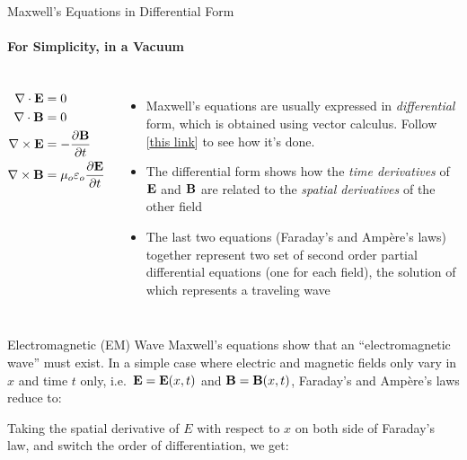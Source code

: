 \documentclass[12pt,aspectratio=169]{beamer}
\newcommand{\eq}[2]{\vspace{#1}{\Large\begin{displaymath}#2\end{displaymath}}}
\begin{document}
\begin{frame}{Maxwell's Equations in Differential Form}
  \framesubtitle{For Simplicity, in a Vacuum}
  \begin{columns}

    {\Large
      \begin{align*}
        \nabla\cdot\mathbf{E} &= 0\\
        \nabla\cdot\mathbf{B} &= 0\\
        \nabla\times\mathbf{E} &=-\frac{\partial\mathbf{B}}{\partial t}\\
        \nabla\times\mathbf{B} &=\mu_o\varepsilon_o\frac{\partial\mathbf{E}}{\partial t}
      \end{align*}
    }

    \begin{itemize}
    \item Maxwell's equations are usually expressed in \emph{differential} form,
      which is obtained using vector calculus. Follow
      [\underline{\href{https://www.wikihow.com/Convert-Maxwell\%27s-Equations-into-Differential-Form}{this link}}]
      to see how it's done.
    \item The differential form shows how the \emph{time derivatives} of
      $\mathbf{E}$ and $\mathbf{B}$ are related to the \emph{spatial derivatives}
      of the other field
    \item The last two equations (Faraday's and Amp\`{e}re's laws) together
      represent two set of second order partial differential equations (one for
      each field), the solution of which represents a traveling wave
    \end{itemize}
  \end{columns}
\end{frame}



\begin{frame}{Electromagnetic (EM) Wave}
  Maxwell's equations show that an ``electromagnetic wave'' must exist. In a
  simple case where electric and magnetic fields only vary in
  $x$ and time $t$ only, i.e.\ $\mathbf{E}=\mathbf{E}(x,t)$ and $\mathbf{B}=\mathbf{B}(x,t)$,
  Faraday's and Amp\`{e}re's laws reduce to:

  \eq{-.1in}{
    \frac{\partial E}{\partial x}=-\frac{\partial B}{\partial t}
    \quad\quad
    \frac{\partial B}{\partial x}=
    -\mu_0\varepsilon_0\frac{\partial E}{\partial t}
  }

  Taking the spatial derivative of $E$ with respect to $x$ on both
  side of Faraday's law, and switch the order of differentiation, we get:

  \eq{-.2in}{
      \frac{\partial}{\partial x}
      \left(\frac{\partial E}{\partial x}\right)
      =-\frac{\partial}{\partial x}\left(\frac{\partial B}{\partial t}\right)
      \quad\rightarrow\quad
      \frac{\partial^2E}{\partial x^2}=
      -\frac{\partial}{\partial t}\left(\frac{\partial B}{\partial x}\right)
  }
\end{frame}
\end{document}
